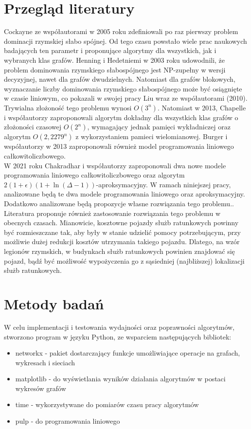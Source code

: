 \section{Przegląd literatury}
Cockayne ze współautorami w 2005 roku zdefiniowali po raz pierwszy problem dominacji rzymskiej słabo spójnej. Od tego czasu powstało wiele prac naukowych badających ten parametr i proponujące algorytmy dla wszystkich, jak i wybranych klas grafów. Henning i Hedetniemi w 2003 roku udowodnili, że problem dominowania rzymskiego słabospójnego jest NP-zupełny w wersji decyzyjnej, nawet dla grafów dwudzielnych. Natomiast dla grafów blokowych, wyznaczanie liczby dominowania rzymskiego słabospójnego może być osiągnięte w czasie liniowym, co pokazali w swojej pracy Liu wraz ze współautorami (2010). \\ 
Trywialna złożoność tego problemu wynosi $O(3^n)$. Natomiast w 2013, Chapelle i współautorzy zaproponowali algorytm dokładny dla wszystkich klas grafów o złożoności czasowej $O(2^n)$, wymagający jednak pamięci wykładniczej oraz algorytm $O(2,2279^n)$ z wykorzystaniem pamieci wielomianowej. Burger i współautorzy w 2013 zaproponowali również model programowania liniowego całkowitoliczbowego. \cite{improvedILP}\\
W 2021 roku Chakradhar i współautorzy zaproponowali dwa nowe modele programowania liniowego całkowitoliczbowego oraz algorytm $2(1+\epsilon)(1 + \ln(\Delta - 1))$-aproksymacyjny. W ramach niniejszej pracy, analizowane będą te dwa modele programowania liniowego oraz aproksymacyjny. Dodatkowo analizowane będą propozycje własne rozwiązania tego problemu.\cite{ILP}.\\
Literatura proponuje również zastosowanie rozwiązania tego problemu w obecnych czasach. Mianowicie, kosztowne pojazdy służb ratunkowych powinny być rozmieszczane tak, aby były w stanie udzielić pomocy potrzebującym, przy możliwie dużej redukcji kosztów utrzymania takiego pojazdu. Dlatego, na wzór legionów rzymskich, w budynkach służb ratunkowych powinien znajdować się pojazd, bądź być możliwość wypożyczenia go z sąsiedniej (najbliższej) lokalizacji służb ratunkowych. \cite{improvedILP}

\section{Metody badań}
W celu implementacji i testowania wydajności oraz poprawności algorytmów, stworzono program w języku Python, ze wsparciem następujących bibliotek:
\begin{itemize}
    \item networkx - pakiet dostarczający funkcje umożliwiające operacje na grafach, wykresach i sieciach
    \item matplotlib - do wyświetlania wyników działania algorytmów w postaci wykresów grafów
    \item time - wykorzystywane do pomiarów czasu pracy algorytmów
    \item pulp - do programowania liniowego
\end{itemize}

